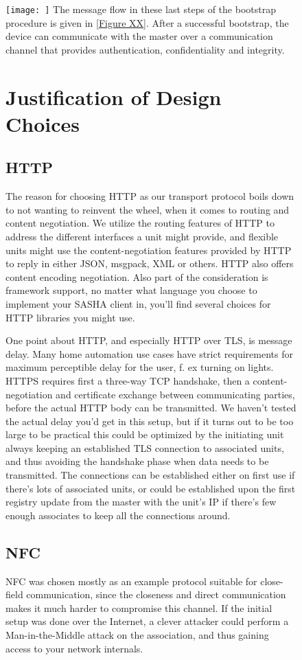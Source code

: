 \begin{figure}[H]
    \centering
    \texttt{[image: ]}
The message flow in these last steps of the bootstrap procedure is given in \autoref{Figure XX}. After a successful bootstrap, the device can communicate with the master over a communication channel that provides authentication, confidentiality and integrity.
\section{Justification of Design Choices}

\subsection{HTTP}
The reason for choosing HTTP as our transport protocol boils down to not wanting to reinvent the wheel, when it comes to routing and content negotiation. We utilize the routing features of HTTP to address the different interfaces a unit might provide, and flexible units might use the content-negotiation features provided by HTTP to reply in either JSON, msgpack, XML or others. HTTP also offers content encoding negotiation. Also part of the consideration is framework support, no matter what language you choose to implement your SASHA client in, you'll find several choices for HTTP libraries you might use.

One point about HTTP, and especially HTTP over TLS, is message delay. Many home automation use cases have strict requirements for maximum perceptible delay for the user, f. ex turning on lights. HTTPS requires first a three-way TCP handshake, then a content-negotiation and certificate exchange between communicating parties, before the actual HTTP body can be transmitted. We haven't tested the actual delay you'd get in this setup, but if it turns out to be too large to be practical this could be optimized by the initiating unit always keeping an established TLS connection to associated units, and thus avoiding the handshake phase when data needs to be transmitted. The connections can be established either on first use if there's lots of associated units, or could be established upon the first registry update from the master with the unit's IP if there's few enough associates to keep all the connections around.

\subsection{NFC}
NFC was chosen mostly as an example protocol suitable for close-field communication, since the closeness and direct communication makes it much harder to compromise this channel. If the initial setup was done over the Internet, a clever attacker could perform a Man-in-the-Middle attack on the association, and thus gaining access to your network internals.


\end{figure}
